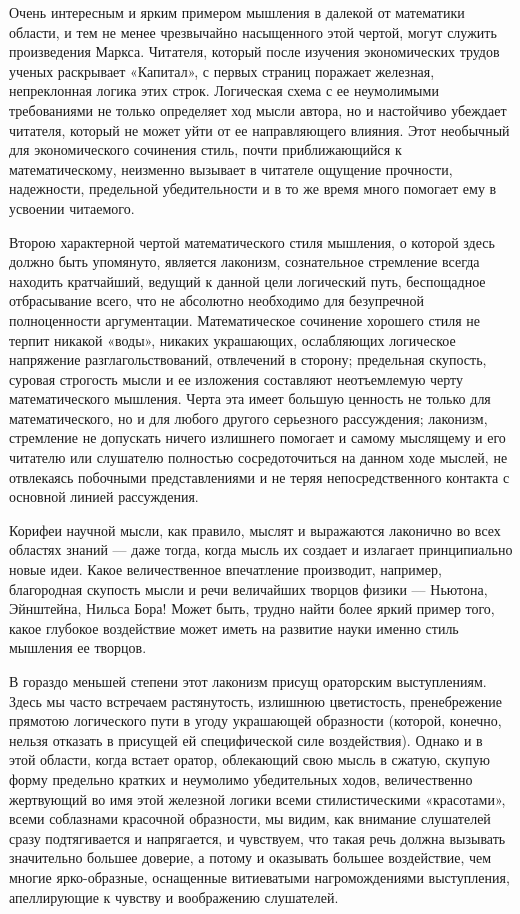 \documentclass[12pt, a4paper, openany]{book}
\begin{document}
Очень интересным и ярким примером мышления в  далекой от математики области, и тем не менее чрезвычайно насыщенного этой чертой, могут служить произведения Маркса. Читателя, который после изучения экономических трудов ученых раскрывает «Капитал», с первых страниц поражает железная, непреклонная логика этих строк. Логическая схема с ее неумолимыми требованиями не только определяет ход мысли автора, но и настойчиво убеждает читателя, который не может уйти от ее  направляющего влияния. Этот необычный для экономического  сочинения стиль, почти приближающийся к математическому, неизменно вызывает в читателе ощущение прочности,  надежности, предельной убедительности и в то же время много помогает ему в усвоении читаемого. 

Второю характерной чертой математического стиля мышления, о которой здесь должно быть упомянуто,  является лаконизм, сознательное стремление всегда  находить кратчайший, ведущий к данной цели логический путь, беспощадное отбрасывание всего, что не абсолютно  необходимо для безупречной полноценности аргументации.  Математическое сочинение хорошего стиля не терпит никакой «воды», никаких украшающих, ослабляющих логическое напряжение разглагольствований, отвлечений в сторону; предельная скупость, суровая строгость мысли и ее  изложения составляют неотъемлемую черту математического мышления. Черта эта имеет большую ценность не только для математического, но и для любого другого серьезного рассуждения; лаконизм, стремление не допускать ничего излишнего помогает и самому мыслящему и его читателю или слушателю полностью сосредоточиться на данном ходе мыслей, не отвлекаясь побочными представлениями и не теряя непосредственного контакта с основной линией рассуждения. 

Корифеи научной мысли, как правило, мыслят и  выражаются лаконично во всех областях знаний — даже  тогда, когда мысль их создает и излагает принципиально новые идеи. Какое величественное впечатление  производит, например, благородная скупость мысли и речи  величайших творцов физики — Ньютона, Эйнштейна, Нильса Бора! Может быть, трудно найти более яркий пример того, какое глубокое воздействие может иметь на развитие  науки именно стиль мышления ее творцов. 

В гораздо меньшей степени этот лаконизм присущ  ораторским выступлениям. Здесь мы часто встречаем  растянутость, излишнюю цветистость, пренебрежение  прямотою логического пути в угоду украшающей образности (которой, конечно, нельзя отказать в присущей ей  специфической силе воздействия). Однако и в этой области, когда встает оратор, облекающий свою мысль в сжатую, скупую форму предельно кратких и неумолимо  убедительных ходов, величественно жертвующий во имя этой железной логики всеми стилистическими «красотами»,  всеми соблазнами красочной образности, мы видим, как  внимание слушателей сразу подтягивается и напрягается, и чувствуем, что такая речь должна вызывать  значительно большее доверие, а потому и оказывать большее  воздействие, чем многие ярко-образные, оснащенные  витиеватыми нагромождениями выступления, апеллирующие к чувству и воображению слушателей. 
\end{document}
